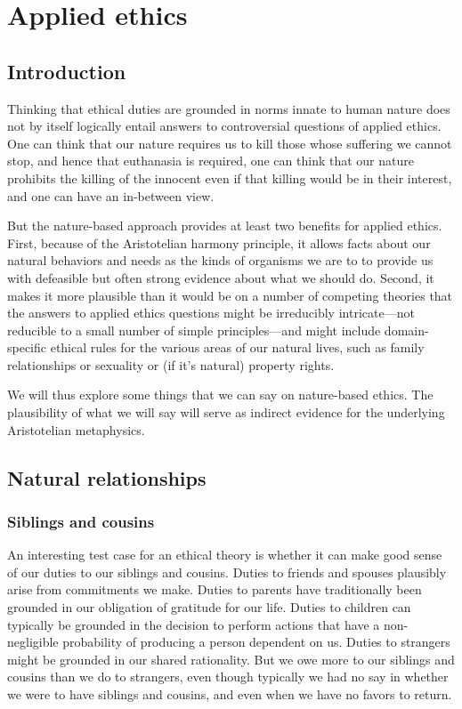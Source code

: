 \def\mychapter{IV}
\chapter{Applied ethics}\label{ch:applied-ethics}
\section{Introduction}
Thinking that ethical duties are grounded in norms innate to human nature does not by itself logically entail answers to controversial 
questions of applied ethics. One can think that our nature requires us to kill those whose suffering we cannot stop,
and hence that euthanasia is required, one can think that our nature prohibits the killing of the innocent even if that killing
would be in their interest, and one can have an in-between view. 

But the nature-based approach provides at least two benefits for applied ethics. First, because of the Aristotelian harmony principle, it 
allows facts about our natural behaviors and needs as the kinds of organisms we are to to provide us with defeasible but often strong
evidence about what we should do. Second, it makes it more plausible than it would be on a number of competing theories that the answers 
to applied ethics questions might be irreducibly intricate---not reducible to a small number of simple principles---and might include 
domain-specific ethical rules for the various areas of our natural lives, such as family relationships or sexuality or (if it's natural)
property rights. 

We will thus explore some things that we can say on nature-based ethics. The plausibility of what we will say will serve as indirect
evidence for the underlying Aristotelian metaphysics.

\section{Natural relationships}
\subsection{Siblings and cousins}
An interesting test case for an ethical theory is whether it can make good sense of our duties to our siblings and cousins. Duties to friends and spouses plausibly
arise from commitments we make. Duties to parents have traditionally been grounded in our obligation of gratitude for our life. Duties to children can
typically be grounded in the decision to perform actions that have a non-negligible probability of producing a person dependent on us. Duties to strangers
might be grounded in our shared rationality. But we owe more to our siblings and cousins than we do to strangers, even though typically we had no say in whether
we were to have siblings and cousins, and even when we have no favors to return.

